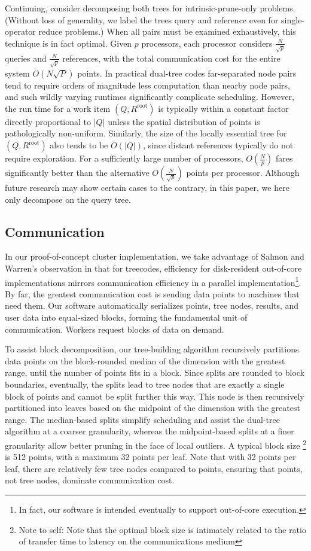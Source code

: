 \documentclass[times, leqno,twocolumn]{article}
\newcommand{\authornote}[1]{\footnote{Note to self: #1}}
\newcommand{\authorsnote}[1]{\authornote{#1}}
\newcommand{\kdroot}[1]{#1^{\text{root}}}
\begin{document}
Continuing, consider decomposing both trees for intrinsic-prune-only problems.
(Without loss of generality, we label the trees query and reference even for single-operator reduce problems.)
When all pairs must be examined exhaustively, this technique is in fact optimal.
Given $p$ processors, each processor considers $\frac{N}{\sqrt{p}}$ queries and $\frac{N}{\sqrt{p}}$ references, with the total communication cost for the entire system $O(N\sqrt{P})$ points.
In practical dual-tree codes far-separated node pairs tend to require orders of magnitude less computation than nearby node pairs, and such wildly varying runtimes significantly complicate scheduling.
However, the run time for a work item $(Q, \kdroot{R})$ is typically within a constant factor directly proportional to $|Q|$ unless the spatial distribution of points is pathologically non-uniform.
Similarly, the size of the locally essential tree for $(Q, \kdroot{R})$ also tends to be $O(|Q|)$, since distant references typically do not require exploration.
For a sufficiently large number of processors, $O(\frac{N}{p})$ fares significantly better than the alternative $O(\frac{N}{\sqrt{p}})$ points per processor.
Although future research may show certain cases to the contrary, in this paper, we here only decompose on the query tree.

\subsection{Communication}

In our proof-of-concept cluster implementation, we take advantage of Salmon and Warren's observation in \cite{salmon97parallel} that for treecodes, efficiency for disk-resident out-of-core implementations mirrors communication efficiency in a parallel implementation\footnote{In fact, our software is intended eventually to support out-of-core execution.}.
By far, the greatest communication cost is sending data points to machines that need them.
Our software automatically serializes points, tree nodes, results, and user data into equal-sized blocks, forming the fundamental unit of communication.
Workers request blocks of data on demand.

To assist block decomposition, our tree-building algorithm recursively partitions data points on the block-rounded median of the dimension with the greatest range, until the number of points fits in a block.
Since splits are rounded to block boundaries, eventually, the splits lead to tree nodes that are exactly a single block of points and cannot be split further this way.
This node is then recursively partitioned into leaves based on the midpoint of the dimension with the greatest range.
The median-based splits simplify scheduling and assist the dual-tree algorithm at a coarser granularity, whereas the midpoint-based splits at a finer granularity allow better pruning in the face of local outliers.
A typical block size \authorsnote{Note that the optimal block size is intimately related to the ratio of transfer time to latency on the communications medium} is 512 points, with a maximum 32 points per leaf.
Note that with 32 points per leaf, there are relatively few tree nodes compared to points, ensuring that points, not tree nodes, dominate communication cost.
\end{document}
